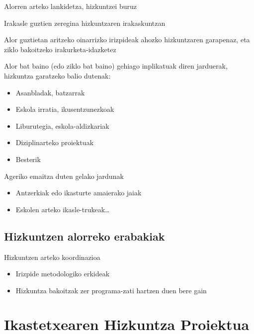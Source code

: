 \documentclass[
]{book}
\providecommand{\tightlist}{%
  \setlength{\itemsep}{0pt}\setlength{\parskip}{0pt}}
\begin{document}
Alorren arteko lankidetza, hizkuntzei buruz

Irakasle guztien zeregina hizkuntzaren irakaskuntzan

Alor guztietan aritzeko oinarrizko irizpideak ahozko hizkuntzaren garapenaz, eta ziklo bakoitzeko irakurketa-idazketez

Alor bat baino (edo ziklo bat baino) gehiago inplikatuak diren jarduerak, hizkuntza garatzeko balio dutenak:

\begin{itemize}
\tightlist
\item
  Asanbladak, batzarrak
\item
  Eskola irratia, ikusentzunezkoak
\item
  Liburutegia, eskola-aldizkariak
\item
  Diziplinarteko proiektuak
\item
  Besterik
\end{itemize}

Ageriko emaitza duten gelako jardunak

\begin{itemize}
\tightlist
\item
  Antzerkiak edo ikasturte amaierako jaiak
\item
  Eskolen arteko ikasle-trukeak\ldots{}
\end{itemize}

\hypertarget{hizkuntzen-alorreko-erabakiak}{%
\subsection{Hizkuntzen alorreko erabakiak}\label{hizkuntzen-alorreko-erabakiak}}

Hizkuntzen arteko koordinazioa

\begin{itemize}
\tightlist
\item
  Irizpide metodologiko erkideak
\item
  Hizkuntza bakoitzak zer programa-zati hartzen duen bere gain
\end{itemize}

\hypertarget{ikastetxearen-hizkuntza-proiektua}{%
\section{Ikastetxearen Hizkuntza Proiektua}\label{ikastetxearen-hizkuntza-proiektua}}
\end{document}
